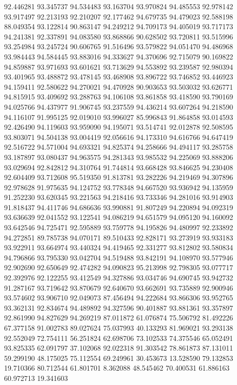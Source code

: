 92.446281
93.345737
94.534483
93.163704
93.970824
94.485553
92.978142
93.917497
92.213193
92.210207
92.177462
94.679735
94.479023
92.588198
88.049354
93.122814
90.863147
94.249212
94.709173
94.405019
93.717173
94.241381
92.337891
94.083580
93.868866
90.628502
93.720811
93.515996
93.254984
93.245724
90.606765
91.516496
93.579822
94.051470
94.486968
93.984443
94.584445
93.883016
94.333627
94.370696
92.715079
90.169822
94.859887
93.971693
93.601621
93.713629
94.553892
93.239587
92.980394
93.401965
93.488872
93.478145
93.468908
93.896722
93.746852
93.446923
94.159411
92.580622
94.270021
94.470928
90.903653
93.503032
93.626771
94.815915
93.409692
93.288763
94.106108
93.861858
93.418590
93.790169
94.025766
94.437977
91.906745
93.237559
94.436214
93.607264
94.218590
94.116107
91.995125
92.019010
93.996027
85.996843
91.864858
93.014593
92.426490
94.119603
93.959090
94.195071
93.514741
92.012878
92.508595
93.803071
94.504138
93.004419
92.056616
94.173310
94.616766
94.647419
92.516722
94.571004
94.693321
94.825374
94.258666
94.494117
93.285758
93.187897
93.080437
94.963575
94.281343
93.985532
94.225069
93.888206
93.029694
92.842812
94.310764
91.744814
93.668428
93.846625
94.230408
92.604409
93.712608
95.519350
91.813781
93.282226
94.219469
94.307896
92.978628
91.975635
94.124752
93.778348
94.667520
93.936942
94.135959
91.252230
93.620345
93.221563
94.218416
93.733346
94.281016
93.914903
91.818437
94.411746
94.686636
93.990881
91.807249
94.220894
94.092319
93.636639
92.041552
93.122541
94.086219
94.651579
94.095120
94.160092
93.642546
94.725471
92.595889
93.759778
94.195826
94.480997
92.233892
94.272851
89.785738
94.070171
89.510433
92.828171
93.273919
93.933183
93.922911
93.664974
93.440324
94.419465
92.331277
93.812802
93.580834
94.796866
93.795330
93.042704
94.519488
93.842191
94.108970
93.577946
92.902690
92.650649
92.474282
94.090823
95.213998
92.798305
93.077717
92.392976
92.122255
93.412549
94.327886
93.034746
94.690745
93.942732
91.287167
93.719642
93.870679
92.640670
93.662691
93.735889
92.900946
93.574602
93.906710
92.049073
87.456494
94.222684
93.866306
93.952765
93.362131
92.834674
94.489892
94.327596
90.401887
93.881361
93.357897
92.861990
94.827629
94.269219
87.011872
61.076874
75.506792
81.492226
67.377158
91.002783
89.027624
75.037993
40.133293
81.969021
93.293138
92.552049
72.754111
56.251824
62.698706
73.102533
74.375546
65.052491
93.825335
62.091797
37.102068
92.022318
91.303542
78.861873
87.131011
59.299190
48.175025
75.112554
69.249961
30.453673
13.528590
79.132853
19.710366
80.712544
61.801701
8.362088
48.545462
70.400531
61.886163
60.972713
19.341603
